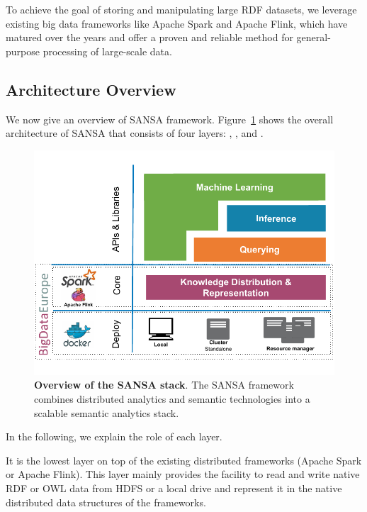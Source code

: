 To achieve the goal of storing and manipulating large \gls{RDF} datasets, we leverage existing big data frameworks like Apache Spark and Apache Flink, which have matured over the years and offer a proven and reliable method for general-purpose processing of large-scale data.

\subsection{Architecture Overview}
\label{sec:sansa-architecture}

We now give an overview of SANSA framework.
Figure~\ref{fig:imp-use-cases-sansa-architecture} shows the overall architecture of SANSA that consists of four layers: , ,  and .

\begin{figure}
\centering 
	\includegraphics[width=0.95\columnwidth]{images/7_implemenation_and_usecases/sansa-architecture.pdf}
	\caption{\textbf{Overview of the SANSA stack}.
	The SANSA framework combines distributed analytics and semantic technologies into a scalable semantic analytics stack.}
	\label{fig:imp-use-cases-sansa-architecture}
\end{figure}

In the following, we explain the role of each layer.

It is the lowest layer on top of the existing distributed frameworks (Apache Spark or Apache Flink).
This layer mainly provides the facility to read and write native \gls{RDF} or \gls{OWL} data from \gls{HDFS} or a local drive and represent it in the native distributed data structures of the frameworks.

